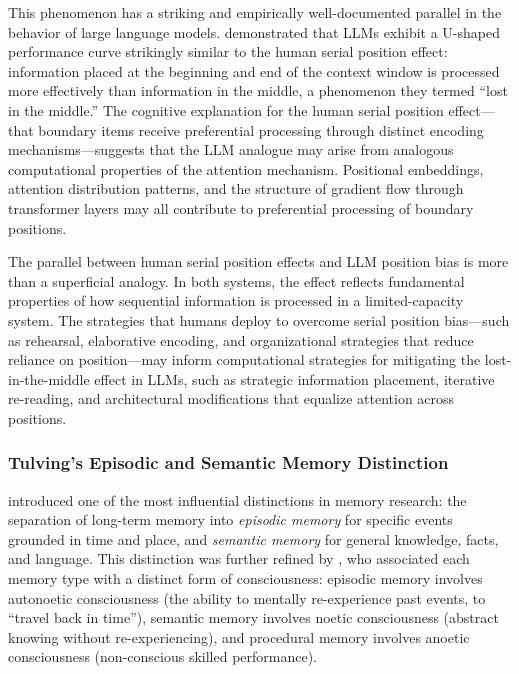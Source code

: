 \documentclass[11pt,letterpaper]{article}
\begin{document}
This phenomenon has a striking and empirically well-documented parallel in the behavior of large language models. \cite{liu2024lost} demonstrated that LLMs exhibit a U-shaped performance curve strikingly similar to the human serial position effect: information placed at the beginning and end of the context window is processed more effectively than information in the middle, a phenomenon they termed ``lost in the middle.'' The cognitive explanation for the human serial position effect---that boundary items receive preferential processing through distinct encoding mechanisms---suggests that the LLM analogue may arise from analogous computational properties of the attention mechanism. Positional embeddings, attention distribution patterns, and the structure of gradient flow through transformer layers may all contribute to preferential processing of boundary positions.

The parallel between human serial position effects and LLM position bias is more than a superficial analogy. In both systems, the effect reflects fundamental properties of how sequential information is processed in a limited-capacity system. The strategies that humans deploy to overcome serial position bias---such as rehearsal, elaborative encoding, and organizational strategies that reduce reliance on position---may inform computational strategies for mitigating the lost-in-the-middle effect in LLMs, such as strategic information placement, iterative re-reading, and architectural modifications that equalize attention across positions.

\subsubsection{Tulving's Episodic and Semantic Memory Distinction}

\cite{tulving1972episodic} introduced one of the most influential distinctions in memory research: the separation of long-term memory into \emph{episodic memory} for specific events grounded in time and place, and \emph{semantic memory} for general knowledge, facts, and language. This distinction was further refined by \cite{tulving1985memory}, who associated each memory type with a distinct form of consciousness: episodic memory involves autonoetic consciousness (the ability to mentally re-experience past events, to ``travel back in time''), semantic memory involves noetic consciousness (abstract knowing without re-experiencing), and procedural memory involves anoetic consciousness (non-conscious skilled performance).
\end{document}

